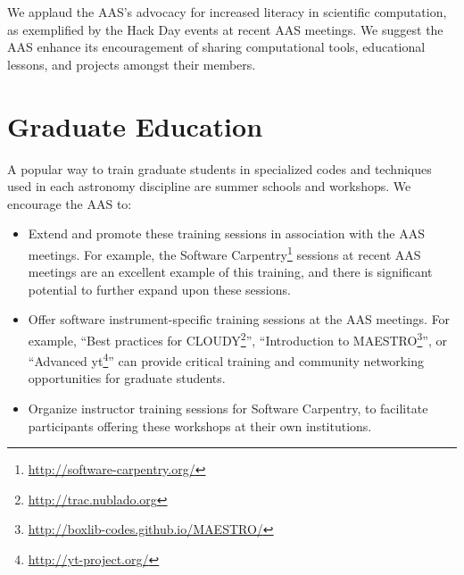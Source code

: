 \documentclass[11pt]{article}
\newenvironment{squishlist}                                                     
  {\begin{itemize}                                                              
    \addtolength{\itemsep}{-0.33\baselineskip}                                  
   }                                                                            
  { \end{itemize} }
\begin{document}
We applaud the AAS's advocacy for increased literacy in scientific computation,
 as exemplified by the Hack Day events at recent AAS meetings.  We
suggest the AAS enhance its encouragement of sharing computational
tools, educational lessons, and projects amongst their members.


%





\section{Graduate Education}

A popular way to train graduate students in specialized codes and
techniques used in each astronomy discipline are summer schools
and workshops. We encourage the AAS to:

\begin{squishlist}

\item Extend and promote these training sessions
in association with the AAS meetings.  
For example, the Software Carpentry\footnote{\url{http://software-carpentry.org/}} 
sessions at recent AAS meetings are an excellent example of this training, 
and there is significant potential to further expand upon these sessions.  

\item Offer software instrument-specific training sessions
at the AAS meetings. For example, ``Best practices for CLOUDY\footnote{\url{http://trac.nublado.org}}'',
``Introduction to MAESTRO\footnote{\url{http://boxlib-codes.github.io/MAESTRO/}}'', or ``Advanced yt\footnote{\url{http://yt-project.org/}}'' can
provide critical training and community networking opportunities for graduate students.

\item Organize instructor training sessions for Software Carpentry,
to facilitate participants offering these workshops at their own institutions.

\end{squishlist}
\end{document}

